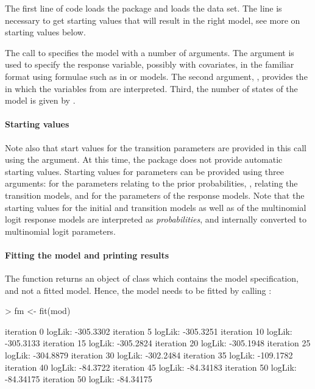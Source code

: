 \documentclass[article]{jss}
\begin{document}
The first line of code loads the  package and 
 loads the  data set. The line
 is necessary to get starting values that will 
result in the right model, see more on starting values below. 

The call to  specifies the model with a number of
arguments.  The  argument is used to specify the
response variable, possibly with covariates, in the familiar format
using formulae such as in  or  models.  The second
argument, , provides the  in which
the variables from  are interpreted.  Third, the number
of states of the model is given by . 


\paragraph{Starting values} Note also that start values for the
transition parameters are provided in this call using the
 argument.  At this time, the package does not provide
automatic starting values.  Starting values for parameters can be
provided using three arguments:  for the parameters
relating to the prior probabilities, , relating the
transition models, and  for the parameters of the
response models.  Note that the starting values for the initial and
transition models as well as of the multinomial logit response models
are interpreted as {\em probabilities}, and internally converted to
multinomial logit parameters.


\paragraph{Fitting the model and printing results} The 
function returns an object of class  which contains the
model specification, and not a fitted model.  Hence, the model needs
to be fitted by calling :
\begin{Schunk}
\begin{Sinput}
> fm <- fit(mod)
\end{Sinput}
\begin{Soutput}
iteration 0 logLik: -305.3302 
iteration 5 logLik: -305.3251 
iteration 10 logLik: -305.3133 
iteration 15 logLik: -305.2824 
iteration 20 logLik: -305.1948 
iteration 25 logLik: -304.8879 
iteration 30 logLik: -302.2484 
iteration 35 logLik: -109.1782 
iteration 40 logLik: -84.3722 
iteration 45 logLik: -84.34183 
iteration 50 logLik: -84.34175 
iteration 50 logLik: -84.34175 
\end{Soutput}
\end{Schunk}
\end{document}

